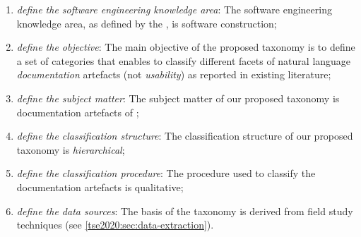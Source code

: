 \begin{enumerate}[label=\textbf{(\arabic*)}]
  \item \textit{define the software engineering knowledge area}: The software engineering knowledge area, as defined by the , is software construction;
  \item \textit{define the objective}: The main objective of the proposed taxonomy is to define a set of categories that enables to classify different facets of natural language  \textit{documentation} artefacts (not  \textit{usability}) as reported in existing literature;
  \item \textit{define the subject matter}: The subject matter of our proposed taxonomy is  documentation artefacts of ;
  \item \textit{define the classification structure}: The classification structure of our  proposed taxonomy is \textit{hierarchical};
  \item \textit{define the classification procedure}: The procedure used to classify the documentation artefacts is qualitative;
  \item \textit{define the data sources}: The basis of the taxonomy is derived from field study techniques (see \cref{tse2020:sec:data-extraction}).
\end{enumerate}

